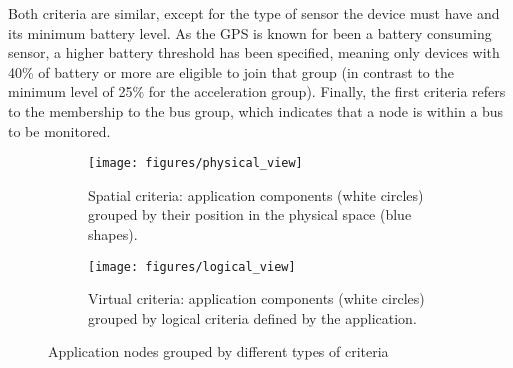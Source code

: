 Both criteria are similar, except for the type of sensor the device must have and its minimum battery level. As the GPS is known for been a battery consuming sensor, a higher battery threshold has been specified, meaning only devices with 40\% of battery or more are eligible to join that group (in contrast to the minimum level of 25\% for the acceleration group). Finally, the first criteria refers to the membership to the bus group, which indicates that a node is within a bus to be monitored.








\begin{figure}[t!]
	\centering
	\begin{subfigure}[b]{0.4\textwidth}
		\centering
		\texttt{[image: figures/physical\_view]}
		\caption{Spatial criteria: application components (white circles) grouped by their position in the physical space (blue shapes).}
		\label{fig:spatial_criteria}
	\end{subfigure}%
	
	\begin{subfigure}[b]{0.4\textwidth}
		\centering
		\texttt{[image: figures/logical\_view]}
		\caption{Virtual criteria: application components (white circles) grouped by logical criteria defined by the application.}
		\label{fig:virtual_criteria}
	\end{subfigure}
	\caption{Application nodes grouped by different types of criteria}
	\label{fig:grouping_criteria}
\end{figure}

